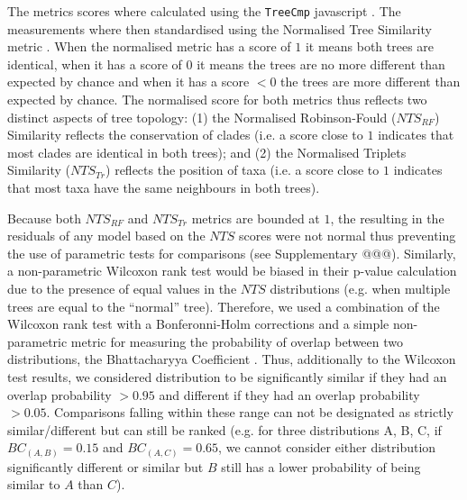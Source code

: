\documentclass[12pt,letterpaper]{article}
\begin{document}
The metrics scores where calculated using the \texttt{TreeCmp} javascript \citep{Bogdanowicz2012}.
The measurements where then standardised using the Normalised Tree Similarity metric \citep[$NTS$; i.e. centering the metrics scores using the mean metric score for 1000 pairwise comparisons between random trees with $n$ taxa;][]{Bogdanowicz2012,Guillerme2016146}.
When the normalised metric has a score of $1$ it means both trees are identical, when it has a score of $0$ it means the trees are no more different than expected by chance and when it has a score $<0$ the trees are more different than expected by chance.
The normalised score for both metrics thus reflects two distinct aspects of tree topology: (1) the Normalised Robinson-Fould ($NTS_{RF}$) Similarity reflects the conservation of clades (i.e. a score close to $1$ indicates that most clades are identical in both trees); and (2) the Normalised Triplets Similarity ($NTS_{Tr}$) reflects the position of taxa (i.e. a score close to $1$ indicates that most taxa have the same neighbours in both trees).

Because both $NTS_{RF}$ and $NTS_{Tr}$ metrics are bounded at $1$, the resulting in the residuals of any model based on the $NTS$ scores were not normal thus preventing the use of parametric tests for comparisons (see Supplementary @@@). %
Similarly, a non-parametric Wilcoxon rank test \citep{hollander2013nonparametric} would be biased in their p-value calculation due to the presence of equal values in the $NTS$ distributions (e.g. when multiple trees are equal to the ``normal'' tree).
Therefore, we used a combination of the Wilcoxon rank test with a Bonferonni-Holm corrections \citep[to ensure our significant results were robust to Type I error rate inflation;][]{holm1979simple} and a simple non-parametric metric for measuring the probability of overlap between two distributions, the Bhattacharyya Coefficient \citep[$BC$;][]{Bhattacharyya,Guillerme2016146,soto2016trace}.
Thus, additionally to the Wilcoxon test results, we considered distribution to be significantly similar if they had an overlap probability $>0.95$ and different if they had an overlap probability $>0.05$.
Comparisons falling within these range can not be designated as strictly similar/different but can still be ranked (e.g. for three distributions A, B, C, if $BC_{(A,B)} = 0.15$ and $BC_{(A,C)} = 0.65$, we cannot consider either distribution significantly different or similar but $B$ still has a lower probability of being similar to $A$ than $C$).
\end{document}
